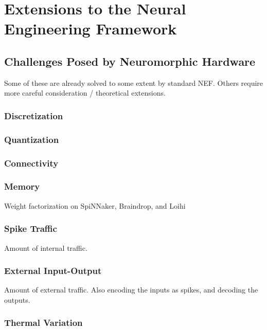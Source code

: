\chapter{Extensions to the Neural Engineering Framework}
\label{chapt:nef-extensions}


\section{Challenges Posed by Neuromorphic Hardware}

Some of these are already solved to some extent by standard NEF. Others require more careful consideration / theoretical extensions.

\subsection{Discretization}

\subsection{Quantization}

\subsection{Connectivity}

\subsection{Memory}

Weight factorization on SpiNNaker, Braindrop, and Loihi

\subsection{Spike Traffic}

Amount of internal traffic.

\subsection{External Input-Output}

Amount of external traffic. Also encoding the inputs as spikes, and decoding the outputs.

\subsection{Thermal Variation}

